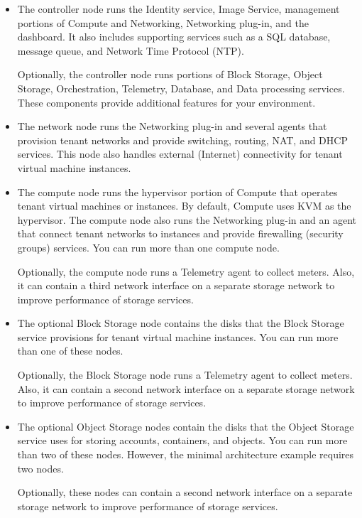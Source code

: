     \begin{itemize}
        \item The controller node runs the Identity service, Image Service, management portions of Compute and Networking, Networking plug-in, and the dashboard. It also includes supporting services such as a SQL database, message queue, and Network Time Protocol (NTP).
        \par Optionally, the controller node runs portions of Block Storage, Object Storage, Orchestration, Telemetry, Database, and Data processing services. These components provide additional features for your environment.
        
        \item The network node runs the Networking plug-in and several agents that provision tenant networks and provide switching, routing, NAT, and DHCP services. This node also handles external (Internet) connectivity for tenant virtual machine instances.
        
        \item The compute node runs the hypervisor portion of Compute that operates tenant virtual machines or instances. By default, Compute uses KVM as the hypervisor. The compute node also runs the Networking plug-in and an agent that connect tenant networks to instances and provide firewalling (security groups) services. You can run more than one compute node.
        \par Optionally, the compute node runs a Telemetry agent to collect meters. Also, it can contain a third network interface on a separate storage network to improve performance of storage services.
        
        \item The optional Block Storage node contains the disks that the Block Storage service provisions for tenant virtual machine instances. You can run more than one of these nodes.
        \par Optionally, the Block Storage node runs a Telemetry agent to collect meters. Also, it can contain a second network interface on a separate storage network to improve performance of storage services.
        
        \item The optional Object Storage nodes contain the disks that the Object Storage service uses for storing accounts, containers, and objects. You can run more than two of these nodes. However, the minimal architecture example requires two nodes.
        \par Optionally, these nodes can contain a second network interface on a separate storage network to improve performance of storage services.
        
    \end{itemize}
    
